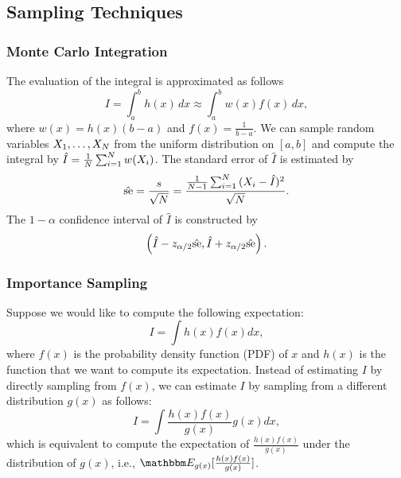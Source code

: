     
\subsection{Sampling Techniques}
    \subsubsection{Monte Carlo Integration}
        The evaluation of the integral is approximated as follows
            \begin{equation}
                I = \int_{a}^{b}{h(x) \, dx} \approx \int_{a}^{b}{w(x) f(x) \, dx},
            \end{equation}
        where $w(x) = h(x)(b-a)$ and $f(x) = \frac{1}{b-a}$.
        We can sample \ndata random variables $X_1, \ldots, X_{N}$ from the uniform distribution on $[a, b]$ and compute the integral by $\hat{I} = \frac{1}{N}\sum_{i=1}^{N}{w(X_i)}$.
        The standard error of $\hat{I}$ is estimated by
            \begin{equation}
                \hat{\text{se}} = \frac{s}{\sqrt{N}} = \frac{ \frac{1}{N-1}\sum_{i=1}^{N}{(X_i - \hat{I} )^2}}{\sqrt{N}}.
            \end{equation}
        The $1-\alpha$ confidence interval of $\hat{I}$ is constructed by
            \begin{equation}
                \left( \hat{I} - z_{\alpha/2}\hat{\text{se}}, \hat{I}+ z_{\alpha/2}\hat{\text{se}} \right).
            \end{equation}
        
    \subsubsection{Importance Sampling}
        Suppose we would like to compute the following expectation:
            \begin{equation}
                I = \int h(x) f(x) d x,
            \end{equation}
        where $f(x)$ is the probability density function (PDF) of $x$ and  $h(x)$ is the function that we want to compute its expectation. 
        Instead of estimating $I$ by directly sampling from $f(x)$, we can estimate $I$ by sampling from a different distribution $g(x)$ as follows:
            \begin{equation}\label{eq:importance_sampling}
                I = \int \frac{h(x) f(x)}{g(x)} g(x) dx,
            \end{equation}
        which is equivalent to compute the expectation of $\frac{h(x) f(x)}{g(x)}$ under the distribution of $g(x)$, i.e., $\E_{g(x)}[\frac{h(x) f(x)}{g(x)}]$.
            
